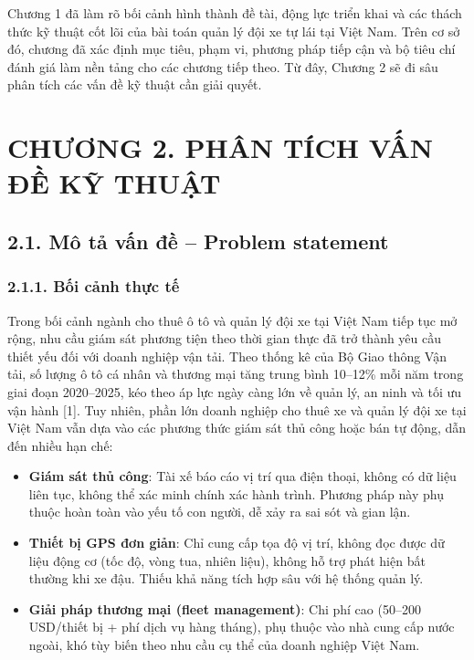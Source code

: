 \documentclass[13pt,a4paper]{extarticle}
\renewcommand{\\}{\thesislongtableorignewline\hline}%
\newcommand{\chapterheading}[1]{\clearpage\section*{#1}\setcounter{subsection}{0}}
\providecommand{\tightlist}{%
  \setlength{\itemsep}{0pt}\setlength{\parskip}{0pt}}
\begin{document}
Chương 1 đã làm rõ bối cảnh hình thành đề tài, động lực triển khai và
các thách thức kỹ thuật cốt lõi của bài toán quản lý đội xe tự lái tại
Việt Nam. Trên cơ sở đó, chương đã xác định mục tiêu, phạm vi, phương
pháp tiếp cận và bộ tiêu chí đánh giá làm nền tảng cho các chương tiếp
theo. Từ đây, Chương 2 sẽ đi sâu phân tích các vấn đề kỹ thuật cần giải
quyết.

\chapterheading{CHƯƠNG 2. PHÂN TÍCH VẤN ĐỀ KỸ THUẬT}

\subsection{2.1. Mô tả vấn đề -- Problem
statement}\label{21-muxf4-tux1ea3-vux1ea5n-ux111ux1ec1--problem-statement}

\subsubsection{2.1.1. Bối cảnh thực
tế}\label{211-bux1ed1i-cux1ea3nh-thux1ef1c-tux1ebf}

Trong bối cảnh ngành cho thuê ô tô và quản lý đội xe tại Việt Nam tiếp
tục mở rộng, nhu cầu giám sát phương tiện theo thời gian thực đã trở
thành yêu cầu thiết yếu đối với doanh nghiệp vận tải. Theo thống kê của
Bộ Giao thông Vận tải, số lượng ô tô cá nhân và thương mại tăng trung
bình 10--12\% mỗi năm trong giai đoạn 2020--2025, kéo theo áp lực ngày
càng lớn về quản lý, an ninh và tối ưu vận hành {[}1{]}. Tuy nhiên, phần
lớn doanh nghiệp cho thuê xe và quản lý đội xe tại Việt Nam vẫn dựa vào
các phương thức giám sát thủ công hoặc bán tự động, dẫn đến nhiều hạn
chế:

\begin{itemize}
\tightlist
\item
  \textbf{Giám sát thủ công}: Tài xế báo cáo vị trí qua điện thoại,
  không có dữ liệu liên tục, không thể xác minh chính xác hành trình.
  Phương pháp này phụ thuộc hoàn toàn vào yếu tố con người, dễ xảy ra
  sai sót và gian lận.
\item
  \textbf{Thiết bị GPS đơn giản}: Chỉ cung cấp tọa độ vị trí, không đọc
  được dữ liệu động cơ (tốc độ, vòng tua, nhiên liệu), không hỗ trợ phát
  hiện bất thường khi xe đậu. Thiếu khả năng tích hợp sâu với hệ thống
  quản lý.
\item
  \textbf{Giải pháp thương mại (fleet management)}: Chi phí cao (50--200
  USD/thiết bị + phí dịch vụ hàng tháng), phụ thuộc vào nhà cung cấp
  nước ngoài, khó tùy biến theo nhu cầu cụ thể của doanh nghiệp Việt
  Nam.
\end{itemize}
\end{document}
